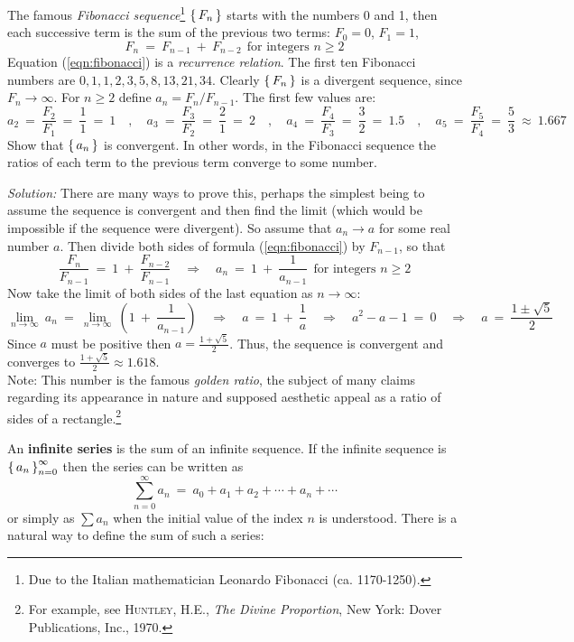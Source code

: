 \begin{exmp}\label{exmp:fib}
\noindent The famous \emph{Fibonacci sequence}\footnote{Due to the Italian
mathematician Leonardo Fibonacci (ca. 1170-1250).} $\left\lbrace\mspace{3mu}F_n\mspace{3mu}\right\rbrace$ starts with the
numbers 0 and 1, then each successive term is the sum of the previous two
terms: $F_0 = 0$, $F_1 = 1$,
\begin{equation}\label{eqn:fibonacci}
F_n ~=~ F_{n-1} ~+~ F_{n-2} ~~\text{for integers $n \ge 2$}
\end{equation}
Equation (\ref{eqn:fibonacci}) is a \emph{recurrence relation}.
The first ten Fibonacci numbers are $0,1,1,2,3,5,8,13,21,34$. Clearly
$\left\lbrace\mspace{3mu}F_n\mspace{3mu}\right\rbrace$ is a divergent sequence, since $F_n \rightarrow \infty$. For
$n \ge 2$ define $a_n = F_n/F_{n-1}$. The first few values are:
\[
a_2 ~=~ \frac{F_2}{F_1} ~=~ \frac{1}{1} ~=~ 1 \quad,\quad
a_3 ~=~ \frac{F_3}{F_2} ~=~ \frac{2}{1} ~=~ 2 \quad,\quad
a_4 ~=~ \frac{F_4}{F_3} ~=~ \frac{3}{2} ~=~ 1.5 \quad,\quad
a_5 ~=~ \frac{F_5}{F_4} ~=~ \frac{5}{3} ~\approx~ 1.667
\]
Show that $\left\lbrace\mspace{3mu}a_n\mspace{3mu}\right\rbrace$ is
convergent. In other words, in the Fibonacci sequence the ratios of each term to
the previous term converge to some number.\vspace{1mm}
\par\noindent\emph{Solution:} There are many ways to prove this, perhaps the
simplest being to assume the sequence is convergent and then find the limit
(which would be impossible if the sequence were divergent). So assume that
$a_n \rightarrow a$ for some real number $a$. Then divide both sides of
formula (\ref{eqn:fibonacci}) by $F_{n-1}$, so that
\[
\frac{F_n}{F_{n-1}} ~=~ 1 ~+~ \frac{F_{n-2}}{F_{n-1}} \quad\Rightarrow\quad
a_n ~=~ 1 ~+~ \frac{1}{a_{n-1}} ~~\text{for integers $n \ge 2$}
\]
Now take the limit of both sides of the last equation as $n \to \infty$:
\[
\lim_{n \to \infty} ~a_n ~=~ \lim_{n \to \infty} ~\left(1 ~+~ \frac{1}{a_{n-1}}\right)
\quad\Rightarrow\quad
a ~=~ 1 ~+~ \frac{1}{a} \quad\Rightarrow\quad a^2 - a - 1 ~=~ 0
\quad\Rightarrow\quad
a ~=~ \frac{1 \pm \sqrt{5}}{2}
\]
Since $a$ must be positive then $a = \frac{1 +\sqrt{5}}{2}$. Thus, the sequence
is convergent and converges to $\frac{1 +\sqrt{5}}{2} \approx 1.618$. \\Note:
This number is the famous \emph{golden ratio}, the subject of many claims
regarding its appearance in nature and supposed aesthetic appeal as a ratio of
sides of a rectangle.\footnote{For example, see \textsc{Huntley, H.E.},
\emph{The Divine Proportion}, New York: Dover Publications, Inc.,
1970.}
\end{exmp}
\divider
\newpage
An \textbf{infinite series} is the sum of an infinite
sequence. If the infinite sequence is $\left\lbrace\mspace{3mu}a_n\mspace{3mu}\right\rbrace_{n=0}^{\infty}$ then the series
can be written as
\[
\sum_{n=0}^{\infty} a_n ~=~ a_0 + a_1 + a_2 + \cdots + a_n + \cdots
\]
or simply as $\sum a_n$ when the initial value of the index $n$ is understood.
There is a natural way to define the sum of such a series:

